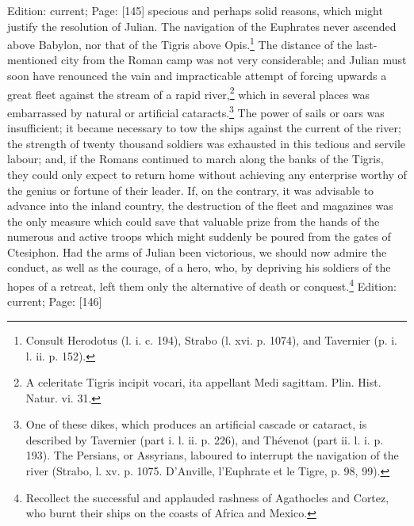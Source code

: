 Edition: current; Page: [145] specious and perhaps solid reasons, which might justify the resolution of Julian. The navigation of the Euphrates never ascended above Babylon, nor that of the Tigris above Opis.\footnote{Consult Herodotus (l. i. c. 194), Strabo (l. xvi. p. 1074), and Tavernier (p. i. l. ii. p. 152).} The distance of the last-mentioned city from the Roman camp was not very considerable; and Julian must soon have renounced the vain and impracticable attempt of forcing upwards a great fleet against the stream of a rapid river,\footnote{A celeritate Tigris incipit vocari, ita appellant Medi sagittam. Plin. Hist. Natur. vi. 31.} which in several places was embarrassed by natural or artificial cataracts.\footnote{One of these dikes, which produces an artificial cascade or cataract, is described by Tavernier (part i. l. ii. p. 226), and Thévenot (part ii. l. i. p. 193). The Persians, or Assyrians, laboured to interrupt the navigation of the river (Strabo, l. xv. p. 1075. D\texthebrew{}’Anville, l\texthebrew{}’Euphrate et le Tigre, p. 98, 99).} The power of sails or oars was insufficient; it became necessary to tow the ships against the current of the river; the strength of twenty thousand soldiers was exhausted in this tedious and servile labour; and, if the Romans continued to march along the banks of the Tigris, they could only expect to return home without achieving any enterprise worthy of the genius or fortune of their leader. If, on the contrary, it was advisable to advance into the inland country, the destruction of the fleet and magazines was the only measure which could save that valuable prize from the hands of the numerous and active troops which might suddenly be poured from the gates of Ctesiphon. Had the arms of Julian been victorious, we should now admire the conduct, as well as the courage, of a hero, who, by depriving his soldiers of the hopes of a retreat, left them only the alternative of death or conquest.\footnote{Recollect the successful and applauded rashness of Agathocles and Cortez, who burnt their ships on the coasts of Africa and Mexico.}
Edition: current; Page: [146]

